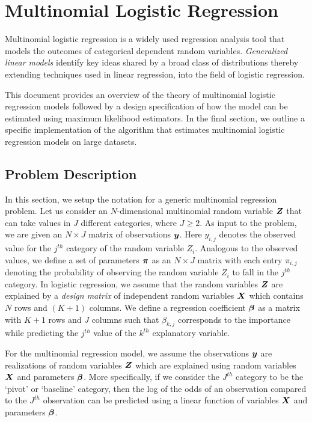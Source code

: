
\section{Multinomial Logistic Regression}\label{sec:multi_intro}

Multinomial logistic regression is a widely used regression analysis tool that
models the outcomes of categorical dependent random variables.
\textit{Generalized linear models} identify key ideas shared by a broad class of
distributions thereby extending techniques used in linear regression, into the
field of logistic regression.

This document provides an overview of the theory of multinomial logistic
regression models followed by a design specification of how the model can be
estimated using maximum likelihood estimators. In the final section, we outline
a specific implementation of the algorithm that estimates multinomial logistic
regression models on large datasets.

\subsection{Problem Description}\label{sec:multi_problem}

In this section, we setup the notation for a generic multinomial regression
problem. Let us consider an $N$-dimensional multinomial random variable $\boldsymbol{Z}$
that can take values in $J$ different categories, where $J \geq 2$. As input to
the problem, we are given an $N\times J$ matrix of observations $\boldsymbol{y}$. Here
$y_{i,j}$ denotes the observed value for the $j^{th}$ category of the random
variable $Z_i$.  Analogous to the observed values, we define a set of parameters
$\boldsymbol{\pi}$  as an $N\times J$ matrix with each entry $\pi_{i,j}$ denoting the
probability of observing the random variable $Z_i$ to fall in the $j^{th}$
category. In logistic regression, we assume that the random variables $\boldsymbol{Z}$
are explained by a \textit{design matrix} of independent random variables $\boldsymbol{X}$
which contains $N$ rows and $(K+1)$ columns. We define a regression coefficient
$\boldsymbol{\beta}$ as a matrix with $K+1$ rows and $J$ columns such that $\beta_{k,j}$
corresponds to the importance while predicting the $j^{th}$ value of the
$k^{th}$ explanatory variable.

For the multinomial regression model, we assume the observations $\boldsymbol{y}$ are
realizations of random variables $\boldsymbol{Z}$ which are explained using random
variables $\boldsymbol{X}$ and parameters $\boldsymbol{\beta}$. More specifically, if we
consider the $J^{th}$ category to be the `pivot' or `baseline' category, then
the log of the odds of an observation compared to the  $J^{th}$ observation can
be predicted using a linear function of variables $\boldsymbol{X}$ and parameters
$\boldsymbol{\beta}$.

